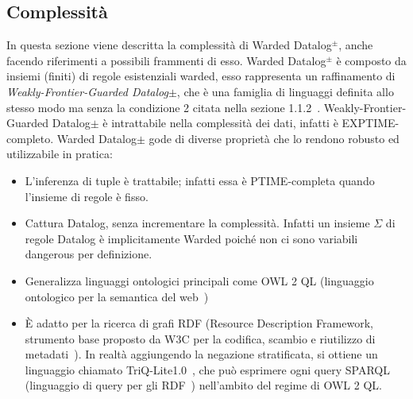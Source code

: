 \subsection{Complessità}

In questa sezione viene descritta la complessità di Warded Datalog$^\pm$, anche facendo riferimenti a possibili frammenti di esso. \newline
Warded Datalog$^\pm$ è composto da insiemi (finiti) di regole esistenziali warded, esso rappresenta un raffinamento di \textit{Weakly-Frontier-Guarded Datalog$\pm$}, che è una famiglia di linguaggi definita allo stesso modo ma senza la condizione 2 citata nella sezione 1.1.2~\cite{baget2011rules}.
Weakly-Frontier-Guarded Datalog$\pm$ è intrattabile nella complessità dei dati, infatti è EXPTIME-completo. \newline \newline
Warded Datalog$\pm$ gode di diverse proprietà che lo rendono robusto ed utilizzabile in pratica:
\begin{itemize}
	\item L'inferenza di tuple è trattabile; infatti essa è PTIME-completa quando l'insieme di regole è fisso.
	\item Cattura Datalog, senza incrementare la complessità. Infatti un insieme $\Sigma$ di regole Datalog è implicitamente Warded poiché non ci sono variabili dangerous per definizione.
	\item Generalizza linguaggi ontologici principali come OWL 2 QL (linguaggio ontologico per la semantica del web~\cite{OWL2QL})
	\item È adatto per la ricerca di grafi RDF (Resource Description Framework, strumento base proposto da W3C per la codifica, scambio e riutilizzo di metadati~\cite{RDFW3C}). In realtà aggiungendo la negazione stratificata, si ottiene un linguaggio chiamato TriQ-Lite1.0~\cite{gottlob2015beyond}, che può esprimere ogni query SPARQL (linguaggio di query per gli RDF~\cite{SPARQLW3C}) nell'ambito del regime di OWL 2 QL.
\end{itemize}

